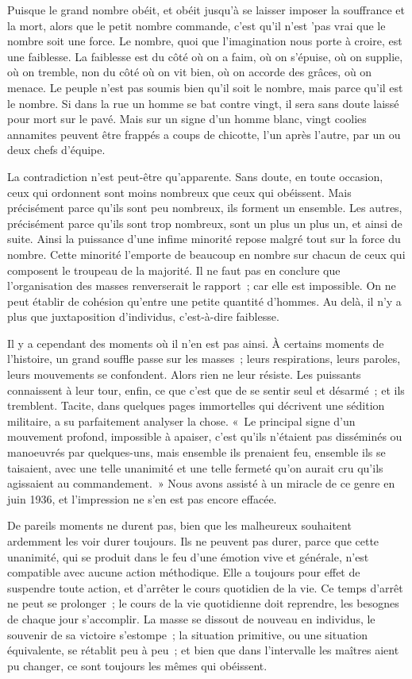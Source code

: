 \documentclass[french,twoside]{book} %
\begin{document}
Puisque le grand nombre obéit, et obéit jusqu'à se laisser imposer la souffrance et la mort, alors que le petit nombre commande, c'est qu'il n'est 'pas vrai que le nombre soit une force. Le nombre, quoi que l'imagination nous porte à croire, est une faiblesse. La faiblesse est du côté où on a faim, où on s'épuise, où on supplie, où on tremble, non du côté où on vit bien, où on accorde des grâces, où on menace. Le peuple n'est pas soumis bien qu'il soit le nombre, mais parce qu'il est le nombre. Si dans la rue un homme se bat contre vingt, il sera sans doute laissé pour mort sur le pavé. Mais sur un signe d'un homme blanc, vingt coolies annamites peuvent être frappés a coups de chicotte, l'un après l'autre, par un ou deux chefs d'équipe.\par
La contradiction n'est peut-être qu'apparente. Sans doute, en toute occasion, ceux qui ordonnent sont moins nombreux que ceux qui obéissent. Mais précisément parce qu'ils sont peu nombreux, ils forment un ensemble. Les autres, précisément parce qu'ils sont trop nombreux, sont un plus un plus un, et ainsi de suite. Ainsi la puissance d'une infime minorité repose malgré tout sur la force du nombre. Cette minorité l'emporte de beaucoup en nombre sur chacun de ceux qui composent le troupeau de la majorité. Il ne faut pas en conclure que l'organisation des masses renverserait le rapport ; car elle est impossible. On ne peut établir de cohésion qu'entre une petite quantité d'hommes. Au delà, il n'y a plus que juxtaposition d'individus, c'est-à-dire faiblesse.\par
Il y a cependant des moments où il n'en est pas ainsi. À certains moments de l'histoire, un grand souffle passe sur les masses ; leurs respirations, leurs paroles, leurs mouvements se confondent. Alors rien ne leur résiste. Les puissants connaissent à leur tour, enfin, ce que c'est que de se sentir seul et désarmé ; et ils tremblent. Tacite, dans quelques pages immortelles qui décrivent une sédition militaire, a su parfaitement analyser la chose. « Le principal signe d'un mouvement profond, impossible à apaiser, c'est qu'ils n'étaient pas disséminés ou manoeuvrés par quelques-uns, mais ensemble ils prenaient feu, ensemble ils se taisaient, avec une telle unanimité et une telle fermeté qu'on aurait cru qu'ils agissaient au commandement. » Nous avons assisté à un miracle de ce genre en juin 1936, et l'impression ne s'en est pas encore effacée.\par
De pareils moments ne durent pas, bien que les malheureux souhaitent ardemment les voir durer toujours. Ils ne peuvent pas durer, parce que cette unanimité, qui se produit dans le feu d'une émotion vive et générale, n'est compatible avec aucune action méthodique. Elle a toujours pour effet de suspendre toute action, et d'arrêter le cours quotidien de la vie. Ce temps d'arrêt ne peut se prolonger ; le cours de la vie quotidienne doit reprendre, les besognes de chaque jour s'accomplir. La masse se dissout de nouveau en individus, le souvenir de sa victoire s'estompe ; la situation primitive, ou une situation équivalente, se rétablit peu à peu ; et bien que dans l'intervalle les maîtres aient pu changer, ce sont toujours les mêmes qui obéissent.\par
\end{document}
